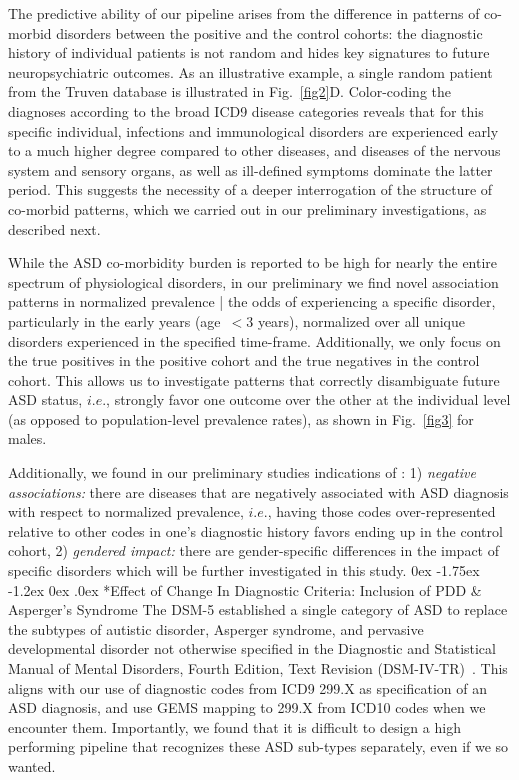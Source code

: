 \documentclass[onecolumn, compsoc,11pt]{IEEEtran}
\makeatletter
\renewcommand\subsection{\@startsection {subsection}{2}{\z@}%
                                   {0ex \@plus -1.75ex \@minus -1.2ex}%
                                   {0ex \@plus.0ex}%
                                   {\fontsize{11}{11}\selectfont\bfseries\sffamily\color{black}}}
\def\treatment{positive\xspace}
\makeatother
\begin{document}
The predictive ability of our pipeline arises from the difference in patterns of co-morbid disorders between the \treatment and the control cohorts: the diagnostic history of individual patients is not random and hides key signatures to future neuropsychiatric outcomes. As an illustrative example, a single random patient from the Truven database is illustrated in Fig.~\ref{fig2}D. Color-coding the diagnoses according to the broad ICD9 disease categories reveals that for this specific individual, infections and immunological disorders are experienced early to a much higher degree compared to other diseases, and diseases of the nervous system and sensory organs, as well as ill-defined symptoms dominate the latter period. This suggests the necessity of a deeper interrogation of the structure of co-morbid patterns, which we carried out in our preliminary investigations, as described next.

While the ASD co-morbidity burden  is reported to be high for nearly the entire spectrum of  physiological disorders, in our preliminary we find novel association patterns in normalized prevalence | the odds of experiencing a specific disorder, particularly in the early years (age~$<3$ years), normalized over all unique disorders experienced in the specified time-frame. Additionally, we only focus on  the true positives in the \treatment cohort and the true negatives in the control cohort. This  allows us to investigate  patterns that correctly disambiguate future ASD status, $i.e.$, strongly favor one outcome over the other at the individual level (as opposed to population-level prevalence rates), as shown in  Fig.~\ref{fig3} for males.

Additionally, we found in our preliminary studies indications of : 1) \textit{negative associations:} there are diseases that are negatively associated with ASD diagnosis with respect to normalized prevalence, $i.e.$, having those codes over-represented relative to other codes in one's diagnostic history favors ending up in the control cohort, 2) \textit{gendered impact:} there are gender-specific differences in the impact of specific disorders which will be further investigated in this study.
%
\subsection*{Effect of Change In Diagnostic Criteria: Inclusion of PDD \&  Asperger's Syndrome}
%
The DSM-5 established a single category of ASD to replace
the subtypes of autistic disorder,
Asperger syndrome, and pervasive
developmental disorder not
otherwise specified in the Diagnostic
and Statistical Manual of Mental
Disorders, Fourth Edition, Text
Revision (DSM-IV-TR)~\cite{hyman2020identification}. This aligns with our use of diagnostic codes from ICD9 299.X as specification of an ASD diagnosis, and use GEMS mapping to 299.X from ICD10 codes when we encounter them.
Importantly, we found that it is  difficult to design a high performing pipeline that recognizes these ASD sub-types separately, even if we so wanted.
%
\end{document}

